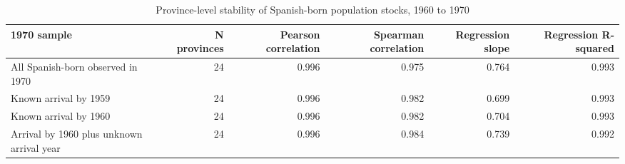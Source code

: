 \begin{table}

\caption{Province-level stability of Spanish-born population stocks, 1960 to 1970}
\centering
\begin{tabular}[t]{lrrrrr}
\toprule
1970 sample & N provinces & Pearson correlation & Spearman correlation & Regression slope & Regression R-squared\\
\midrule
All Spanish-born observed in 1970 & 24 & 0.996 & 0.975 & 0.764 & 0.993\\
Known arrival by 1959 & 24 & 0.996 & 0.982 & 0.699 & 0.993\\
Known arrival by 1960 & 24 & 0.996 & 0.982 & 0.704 & 0.993\\
Arrival by 1960 plus unknown arrival year & 24 & 0.996 & 0.984 & 0.739 & 0.992\\
\bottomrule
\end{tabular}
\end{table}
